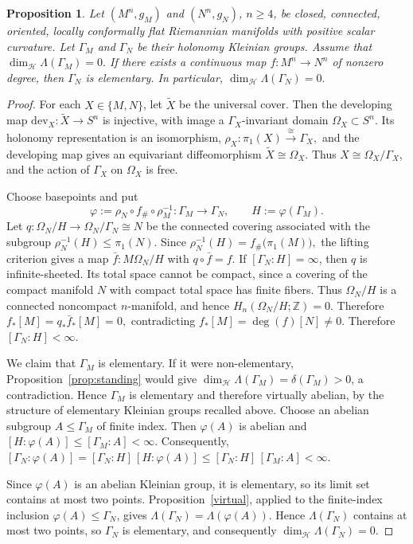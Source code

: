 \documentclass[12pt,oneside,a4paper]{article}
\newtheorem{proposition}[definition]{Proposition}
\theoremstyle{mytheorem}
\theoremstyle{remark}
\theoremstyle{definition}
\begin{document}
\begin{proposition}\label{degree}
Let $(M^n,g_M)$ and $(N^n,g_N)$, $n\geq4$, be closed, connected,
oriented, locally conformally flat Riemannian manifolds with positive
scalar curvature. Let $\Gamma_M$ and $\Gamma_N$ be their holonomy
Kleinian groups. Assume that
\(
\dim_{\mathcal H}\Lambda(\Gamma_M)=0.
\)
If there exists a continuous map $f\colon M^n\to N^n$ of nonzero degree, then
$\Gamma_N$ is elementary. In particular,
$\dim_{\mathcal H}\Lambda(\Gamma_N)=0.$
\end{proposition}


\begin{proof}
For each $X\in\{M,N\}$, let $\widetilde X$ be the universal cover. Then the developing map
$\mathrm{dev}_X\colon\widetilde X\to S^n$
is injective, with image a $\Gamma_X$-invariant domain
$\Omega_X\subset S^n$. Its holonomy representation is an isomorphism,
$\rho_X\colon\pi_1(X)\stackrel{\cong}{\to}\Gamma_X,$
and the developing map gives an equivariant diffeomorphism
$\widetilde X\cong\Omega_X$. Thus
$X\cong\Omega_X/\Gamma_X$, and the action of $\Gamma_X$ on $\Omega_X$
is free.

Choose basepoints and put
\[
\varphi:=\rho_N\circ f_\#\circ\rho_M^{-1}
\colon\Gamma_M\longrightarrow\Gamma_N,
\qquad H:=\varphi(\Gamma_M).
\]
Let
\(q\colon\Omega_N/H\to \Omega_N/\Gamma_N\cong N\)
be the connected covering associated with the subgroup
\(\rho_N^{-1}(H)\leq\pi_1(N)\). Since
\(
\rho_N^{-1}(H)=f_\#\bigl(\pi_1(M)\bigr),
\)
the lifting criterion gives a map
\(\bar f\colon M\Omega_N/H\)
with \(q\circ\bar f=f\).
If $[\Gamma_N:H]=\infty$, then $q$ is infinite-sheeted. Its total space
cannot be compact, since a covering of the compact manifold \(N\) with
compact total space has finite fibers. Thus \(\Omega_N/H\) is a connected
noncompact $n$-manifold, and hence
$H_n(\Omega_N/H;\mathbb Z)=0$. Therefore
\(
f_*[M]=q_*\bar f_*[M]=0,
\)
contradicting $f_*[M]=\deg(f)[N]\neq0$. Therefore
$[\Gamma_N:H]<\infty$.

We claim that $\Gamma_M$ is elementary. If it were non-elementary,
Proposition~\ref{prop:standing} would give
$\dim_{\mathcal H}\Lambda(\Gamma_M)=\delta(\Gamma_M)>0$,
a contradiction. Hence $\Gamma_M$ is elementary and therefore virtually
abelian, by the structure of elementary Kleinian groups recalled above.
Choose an abelian subgroup $A\leq\Gamma_M$ of finite index. Then
$\varphi(A)$ is abelian and
$[H:\varphi(A)]\leq[\Gamma_M:A]<\infty$.
Consequently,
$[\Gamma_N:\varphi(A)]
=[\Gamma_N:H]\,[H:\varphi(A)]
\leq[\Gamma_N:H]\,[\Gamma_M:A]<\infty$.

Since $\varphi(A)$ is an abelian Kleinian group, it is elementary, so its
limit set contains at most two points. Proposition~\ref{virtual}, applied
to the finite-index inclusion $\varphi(A)\leq\Gamma_N$, gives
$\Lambda(\Gamma_N)=\Lambda(\varphi(A))$. Hence $\Lambda(\Gamma_N)$
contains at most two points, so $\Gamma_N$ is elementary, and
consequently $\dim_{\mathcal H}\Lambda(\Gamma_N)=0$.
\end{proof}
\end{document}
